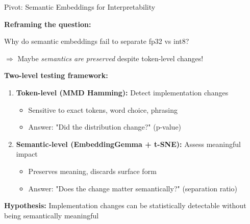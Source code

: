 \documentclass[aspectratio=169,11pt]{beamer}
\begin{document}
\begin{frame}{Pivot: Semantic Embeddings for Interpretability}

\textbf{Reframing the question:}

\vspace{0.5em}

Why do semantic embeddings fail to separate fp32 vs int8?

$\Rightarrow$ Maybe \emph{semantics are preserved} despite token-level changes!

\vspace{1em}

\textbf{Two-level testing framework:}

\begin{enumerate}
  \item \textbf{Token-level (MMD Hamming):} Detect implementation changes
  \begin{itemize}
    \item Sensitive to exact tokens, word choice, phrasing
    \item Answer: "Did the distribution change?" (p-value)
  \end{itemize}

  \vspace{0.5em}

  \item \textbf{Semantic-level (EmbeddingGemma + t-SNE):} Assess meaningful impact
  \begin{itemize}
    \item Preserves meaning, discards surface form
    \item Answer: "Does the change matter semantically?" (separation ratio)
  \end{itemize}
\end{enumerate}

\vspace{0.5em}

\textbf{Hypothesis:} Implementation changes can be statistically detectable without being semantically meaningful

\end{frame}
\end{document}
